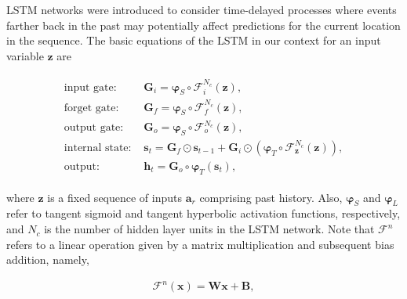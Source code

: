 \documentclass[preprint,12pt]{elsarticle}
\begin{document}
LSTM networks were introduced to consider time-delayed processes where events farther back in the past may potentially affect predictions for the current location in the sequence. The basic equations of the LSTM in our context for an input variable $\mathbf{z}$ are 
\begin{linenomath*}
\begin{align}
\begin{split}
\text{input gate: }& \boldsymbol{G}_{i}=\boldsymbol{\varphi}_{S} \circ \mathcal{F}_{i}^{N_{c}}(\mathbf{z}), \\
\text{forget gate: }& \boldsymbol{G}_{f}=\boldsymbol{\varphi}_{S} \circ \mathcal{F}_{f}^{N_{c}}(\mathbf{z}), \\
\text{output gate: }& \boldsymbol{G}_{o}=\boldsymbol{\varphi}_{S} \circ \mathcal{F}_{o}^{N_{c}}(\mathbf{z}), \\
\text{internal state: }& \boldsymbol{s}_{t}=\boldsymbol{G}_{f} \odot \boldsymbol{s}_{t-1}+\boldsymbol{G}_{i} \odot\left(\boldsymbol{\varphi}_{T} \circ \mathcal{F}_{\mathbf{z}}^{N_{c}}(\mathbf{z})\right), \\
\text{output: }& \mathbf{h}_t = \boldsymbol{G}_{o} \circ \boldsymbol{\varphi}_{T}\left(\boldsymbol{s}_{t}\right),
\end{split}
\end{align}
\end{linenomath*}
where $\mathbf{z}$ is a fixed sequence of inputs $\textbf{a}_r$ comprising past history. Also, $\boldsymbol{\varphi}_{S}$ and $\boldsymbol{\varphi}_{L}$ refer to tangent sigmoid and tangent hyperbolic activation functions, respectively, and $N_c$ is the number of hidden layer units in the LSTM network. Note that $\mathcal{F}^{n}$ refers to a linear operation given by a matrix multiplication and subsequent bias addition, namely,
\begin{linenomath*}
\begin{align}
\mathcal{F}^{n}(\boldsymbol{x})=\boldsymbol{W} \boldsymbol{x}+\boldsymbol{B},
\end{align}
\end{linenomath*}
\end{document}
